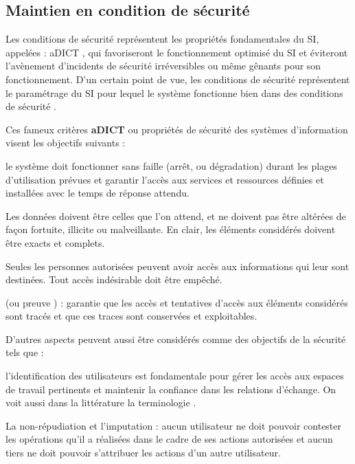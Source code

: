 \subsection{Maintien en condition de sécurité}

Les conditions de sécurité représentent les propriétés fondamentales du SI, appelées : \gls{aDICT} , qui favoriseront le fonctionnement optimisé du SI et éviteront l'avènement d'incidents de sécurité irréversibles ou même gênants pour son fonctionnement. D'un certain point de vue, les conditions de sécurité représentent le paramétrage du SI pour lequel le système fonctionne bien dans des conditions de sécurité .

Ces fameux critères \textbf{\gls{aDICT}} ou propriétés de sécurité des systèmes d'information visent les objectifs suivants :
\begin{nota}[DISPONIBILITE]
le système doit fonctionner sans faille (arrêt, ou dégradation) durant les plages d'utilisation prévues et garantir l'accès aux services et ressources définies et installées avec le temps de réponse attendu.
\end{nota}
\begin{nota}[INTEGRITE]
Les données doivent être celles que l'on attend, et ne doivent pas être altérées de façon fortuite, illicite ou malveillante. En clair, les éléments considérés doivent être exacts et complets.
\end{nota}
\begin{nota}[CONFIDENTIALITE] Seules les personnes autorisées peuvent avoir accès aux informations qui leur sont destinées. Tout accès indésirable doit être empêché.
\end{nota}
\begin{nota}[TRACABILITE] (ou preuve ) : garantie que les accès et tentatives d'accès aux éléments considérés sont tracés et que ces traces sont conservées et exploitables.
\end{nota}
D'autres aspects peuvent aussi être considérés comme des objectifs de la sécurité tels que :
\begin{nota}[AUTHENTICITE]
l'identification des utilisateurs est fondamentale pour gérer les accès aux espaces de travail pertinents et maintenir la confiance dans les relations d'échange. On voit aussi dans la littérature la terminologie .
\end{nota}
\begin{nota}
La non-répudiation et l'imputation : aucun utilisateur ne doit pouvoir contester les opérations qu'il a réalisées dans le cadre de ses actions autorisées et aucun tiers ne doit pouvoir s'attribuer les actions d'un autre utilisateur.
\end{nota}

